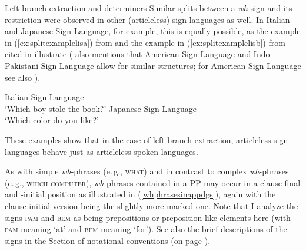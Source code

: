 \begin{digression}{Left-branch extraction and determiners}{}
Similar splits between a \textit{wh}-sign and its restriction were observed in other (articleless) sign languages as well. In Italian and Japanese Sign Language, for example, this is equally possible, as the example in (\ref{ex:splitexamplelisa}) from \citet[285]{cecchetto2009another} and the example in (\ref{ex:splitexamplelisb}) from \citet{fischer1998feature} cited in \citet[25]{zeshan2004interrogative} illustrate (\citealt{zeshan2004interrogative} also mentions that American Sign Language and Indo-Pakistani Sign Language allow for similar structures; for American Sign Language see also \citealt{boster1996quantifier}). 

\begin{exe}
\ex\label{splitexamplelis}\begin{xlist}
\ex Italian Sign Language \\ 
\glt `Which boy stole the book?' \label{ex:splitexamplelisa} 
\ex Japanese Sign Language \\  
\glt `Which color do you like?' \label{ex:splitexamplelisb} 
\end{xlist}
\end{exe} 

\noindent These examples show that in the case of left-branch extraction, articleless sign languages behave just as articleless spoken languages. 
\end{digression}


\noindent As with simple \textit{wh}-phrases (e.\,g., \textsc{what}) and in contrast to complex \textit{wh}-phrases (e.\,g., \textsc{which computer}), \textit{wh}-phrases contained in a PP may occur in a clause-final and -initial position as illustrated in (\ref{whphrasesinappdgs}), again with the clause-initial version being the slightly more marked one. Note that I analyze the signs \textsc{pam} and \textsc{bem} as being prepositions or preposition-like elements here (with \textsc{pam} meaning `at' and \textsc{bem} meaning `for'). See also the brief descriptions of the signs in the Section of notational conventions (on page \pageref{notational}).




